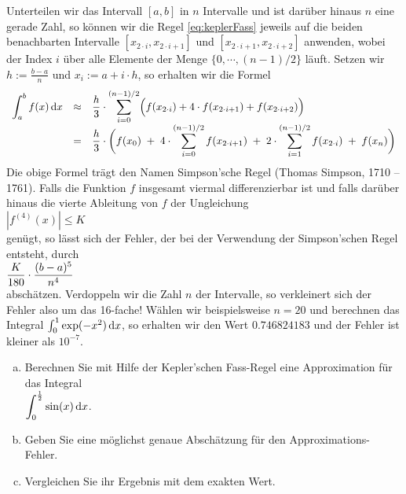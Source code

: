 Unterteilen wir das Intervall $[a,b]$ in $n$ Intervalle und ist dar\"uber hinaus $n$ eine
gerade Zahl, so k\"onnen wir die Regel \ref{eq:keplerFass} jeweils auf die beiden  benachbarten
Intervalle $[x_{2\cdot i},x_{2\cdot i+1}]$ und $[x_{2\cdot i+1},x_{2\cdot i+2}]$ anwenden,
wobei der Index $i$ \"uber alle Elemente der Menge $\{0,\cdots,(n-1)/2\}$ l\"auft.
Setzen wir $h:=\frac{b-a}{n}$ und $x_i := a + i\cdot h$, so erhalten wir
die Formel 
\begin{equation}
  \label{eq:intSimpson}  
\begin{array}[t]{lcl}
 \displaystyle \int_a^b f(x)\,\textrm{d} x 
& \approx & \displaystyle\frac{h}{3}\cdot \sum\limits_{i=0}^{(n-1)/2} \Bigl( f(x_{2\cdot i}) + 4\cdot f(x_{2\cdot i+1}) + f(x_{2\cdot i+2}) \Bigr) \\[0.3cm]
& = & \displaystyle\frac{h}{3}\cdot \biggl(f(x_0) \;+\; 4\cdot \sum\limits_{i=0}^{(n-1)/2} f(x_{2\cdot i+1}) \;+\;
                                                          2\cdot \sum\limits_{i=1}^{(n-1)/2} f(x_{2\cdot i}) \;+\; f(x_n)\biggr) \\[0.3cm]
\end{array}
\end{equation}
Die obige Formel tr\"agt den Namen Simpson'sche Regel (Thomas Simpson, 1710 -- 1761).
Falls die Funktion $f$ insgesamt viermal differenzierbar ist und falls dar\"uber hinaus 
die vierte Ableitung von $f$ der Ungleichung 
\\[0.2cm]
\hspace*{1.3cm}
$|f^{(4)}(x)| \leq K$
\\[0.2cm]
gen\"ugt, so l\"asst sich der Fehler, der bei der Verwendung der Simpson'schen Regel entsteht, durch
\\[0.2cm]
\hspace*{1.3cm}
$\displaystyle\frac{K}{180}\cdot \frac{(b-a)^5}{n^4}$
\\[0.2cm]
absch\"atzen.  Verdoppeln wir die Zahl $n$ der Intervalle, so verkleinert sich der Fehler
also um das 16-fache! W\"ahlen wir beispielsweise $n=20$ und berechnen das Integral
$\int_0^1 \exp(-x^2)\, \textrm{d} x$, so erhalten wir den Wert
$0.746824183$ und der Fehler ist kleiner als $10^{-7}$.
\vspace*{0.3cm}


\exercise
\begin{enumerate}[(a)]
\item Berechnen Sie mit Hilfe der Kepler'schen Fass-Regel eine Approximation 
      f\"ur das Integral 
      \\[0.2cm]
      \hspace*{1.3cm}$\displaystyle \int_0^{\frac{1}2} \sin(x)\, \textrm{d} x$.
\item Geben Sie eine m\"oglichst genaue Absch\"atzung f\"ur den Approximations-Fehler.
\item Vergleichen Sie ihr Ergebnis mit dem exakten Wert. \eod
\end{enumerate}
\pagebreak

